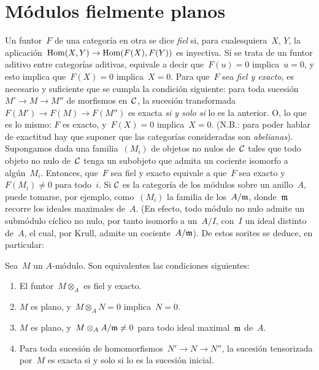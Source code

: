 
\section{Módulos fielmente planos}
\label{IV.2}

Un funtor~$F$ de una categoría en otra se dice 
\emph{fiel} si, para cualesquiera~$X$, $Y$, la aplicación~$\Hom(X,Y)\to
\Hom(F(X),F(Y))$ es inyectiva. Si se trata de un funtor aditivo entre
categorías aditivas, equivale a decir que~$F(u)=0$ implica~$u=0$, y esto
implica que~$F(X)=0$ implica~$X=0$. Para que~$F$ sea \emph{fiel y exacto},
es necesario y suficiente que se cumpla la condición siguiente: para toda
sucesión~$M'\to M\to M''$ de morfismos en~$\cal{C}$, la sucesión transformada
{$F(M')\to F(M)\to F(M'')$}
es exacta \emph{si y solo si} lo es la anterior. O, lo que es lo mismo:
$F$ es exacto, y~$F(X)=0$ implica~$X=0$. (N.B.: para poder hablar de
exactitud hay que suponer que las categorías consideradas son
\emph{abelianas}). Supongamos dada una familia~$(M_i)$ de objetos no nulos
de~$\cal{C}$ tales que todo objeto no nulo de~$\cal{C}$ tenga un subobjeto
que admita un cociente isomorfo a algún~$M_i$. Entonces, que~$F$ sea fiel y
exacto equivale a que~$F$ sea exacto y~$F(M_i)\neq0$ para todo~$i$. Si
$\cal{C}$ es la categoría de los módulos sobre un anillo~$A$, puede tomarse,
por ejemplo, como~$(M_i)$ la familia de los~$A/\goth{m}$, donde~$\goth{m}$
recorre los ideales maximales de~$A$. (En efecto, todo módulo no nulo admite
un submódulo cíclico no nulo, por tanto isomorfo a un~$A/I$, con~$I$ un
ideal distinto de~$A$, el cual, por Krull, admite un cociente~$A/\goth{m}$).
De estos sorites se deduce, en particular:

\begin{proposition}
\label{IV.2.1}
Sea~$M$ un $A$-módulo. Son equivalentes las condiciones siguientes:
\begin{enumerate}
\item[(i)] El funtor~$M\otimes_A$ es fiel y exacto.
\item[(i~bis)]
$M$ es plano, y~$M\otimes_A N=0$ implica~$N=0$.
\item[(i~ter)] $M$ es plano, y~$M\otimes_A A/\goth{m}\neq0$ para todo ideal
maximal~$\goth{m}$ de~$A$.
\item[(ii)] Para toda sucesión de homomorfismos~$N'\to N\to N''$, la
sucesión tensorizada por~$M$ es exacta si y solo si lo es la sucesión
inicial.
\end{enumerate}
\end{proposition}

